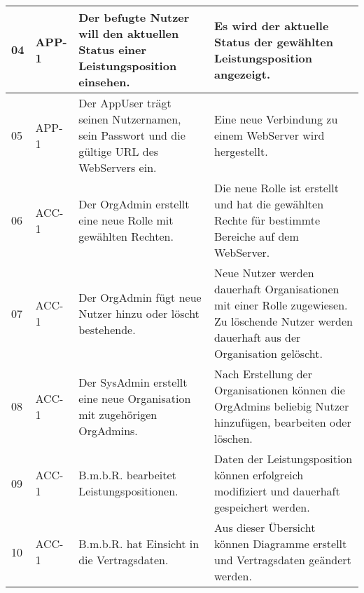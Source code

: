\begin{longtable}[c]{|p{1cm}|p{3cm}|p{4cm}|p{6cm}|}
    04           & APP-1                      & Der befugte Nutzer will den aktuellen Status einer Leistungsposition einsehen.                                     & Es wird der aktuelle Status der gewählten Leistungsposition angezeigt.                                                                                                     \\ \hline
    05           & APP-1                      & Der AppUser trägt seinen Nutzernamen, sein Passwort und die gültige URL des WebServers ein.                        & Eine neue Verbindung zu einem WebServer wird hergestellt.                                                                                                                  \\ \hline
    06           & ACC-1                      & Der OrgAdmin erstellt eine neue Rolle mit gewählten Rechten.                                                       & Die neue Rolle ist erstellt und hat die gewählten Rechte für bestimmte Bereiche auf dem WebServer.                                                                         \\ \hline
    07           & ACC-1                      & Der OrgAdmin fügt neue Nutzer hinzu oder löscht bestehende.                                                        & Neue Nutzer werden dauerhaft Organisationen mit einer Rolle zugewiesen. Zu löschende Nutzer werden dauerhaft aus der Organisation gelöscht.                                \\ \hline
    08           & ACC-1                      & Der SysAdmin erstellt eine neue Organisation mit zugehörigen OrgAdmins.                                            & Nach Erstellung der Organisationen können die OrgAdmins beliebig Nutzer hinzufügen, bearbeiten oder löschen.                                                               \\ \hline
    09           & ACC-1                      & B.m.b.R. bearbeitet Leistungspositionen.                                                                           & Daten der Leistungsposition können erfolgreich modifiziert und dauerhaft gespeichert werden.                                                                               \\ \hline
    10           & ACC-1                      & B.m.b.R. hat Einsicht in die Vertragsdaten.                                                                        & Aus dieser Übersicht können Diagramme erstellt und Vertragsdaten geändert werden.                                                                                          \\ \hline

\end{longtable}

